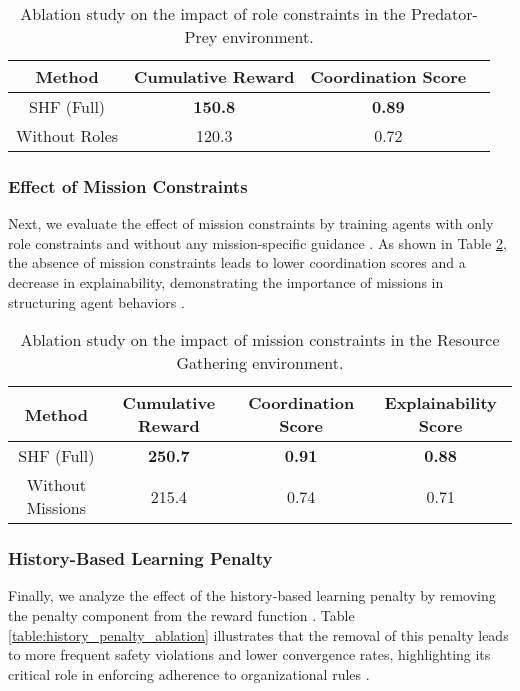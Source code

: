 \documentclass[sigconf,anonymous]{aamas}
\begin{document}
\begin{table}[ht]
\centering
\caption{Ablation study on the impact of role constraints in the Predator-Prey environment.}
\label{table:role_ablation}
\begin{tabular}{|c|c|c|c|}
\hline
\textbf{Method} & \textbf{Cumulative Reward} & \textbf{Coordination Score} \\ \hline
SHF (Full) & \textbf{150.8} & \textbf{0.89} \\ \hline
Without Roles & 120.3 & 0.72 \\ \hline
\end{tabular}
\end{table}

\subsubsection{Effect of Mission Constraints}
Next, we evaluate the effect of mission constraints by training agents with only role constraints and without any mission-specific guidance \cite{hubner2010moise}. As shown in Table \ref{table:mission_ablation}, the absence of mission constraints leads to lower coordination scores and a decrease in explainability, demonstrating the importance of missions in structuring agent behaviors \cite{hernandez2019survey}.

\begin{table}[ht]
\centering
\caption{Ablation study on the impact of mission constraints in the Resource Gathering environment.}
\label{table:mission_ablation}
\begin{tabular}{|c|c|c|c|}
\hline
\textbf{Method} & \textbf{Cumulative Reward} & \textbf{Coordination Score} & \textbf{Explainability Score} \\ \hline
SHF (Full) & \textbf{250.7} & \textbf{0.91} & \textbf{0.88} \\ \hline
Without Missions & 215.4 & 0.74 & 0.71 \\ \hline
\end{tabular}
\end{table}

\subsubsection{History-Based Learning Penalty}
Finally, we analyze the effect of the history-based learning penalty by removing the penalty component from the reward function \cite{foerster2018counterfactual}. Table \ref{table:history_penalty_ablation} illustrates that the removal of this penalty leads to more frequent safety violations and lower convergence rates, highlighting its critical role in enforcing adherence to organizational rules \cite{hubner2010moise}.
\end{document}
